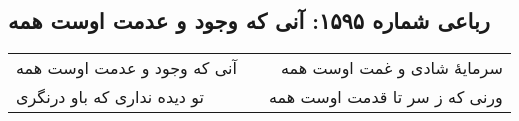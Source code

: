 \begin{center}
\section*{رباعی شماره ۱۵۹۵: آنی که وجود و عدمت اوست همه}
\label{sec:1595}
\begin{longtable}{l p{0.5cm} r}
آنی که وجود و عدمت اوست همه
&&
سرمایهٔ شادی و غمت اوست همه
\\
تو دیده نداری که باو درنگری
&&
ورنی که ز سر تا قدمت اوست همه
\\
\end{longtable}
\end{center}
